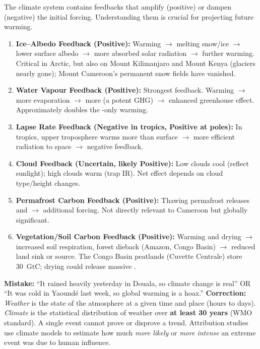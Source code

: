 \documentclass[11pt]{article}
\newcounter{popsec}
\newcounter{popsub}
\newcommand{\courssub}[1]{%
  \stepcounter{popsub}%
  \par\vspace{9pt}\noindent{\popxbold\fontsize{11.5}{13}\selectfont\color{popink}{\color{poporange}\thepopsec.\thepopsub}\hspace{6pt}#1}\par\nopagebreak\vspace{4pt}
}
\begin{document}
\courssub{Climate Feedback Loops}

The climate system contains feedbacks that amplify (positive) or dampen (negative) the initial forcing. Understanding them is crucial for projecting future warming.

\begin{propriete}
\begin{enumerate}
\item \textbf{Ice–Albedo Feedback (Positive):} Warming $\to$ melting snow/ice $\to$ lower surface albedo $\to$ more absorbed solar radiation $\to$ further warming. Critical in Arctic, but also on Mount Kilimanjaro and Mount Kenya (glaciers nearly gone); Mount Cameroon's permanent snow fields have vanished.
\item \textbf{Water Vapour Feedback (Positive):} Strongest feedback. Warming $\to$ more evaporation $\to$ more  (a potent GHG) $\to$ enhanced greenhouse effect. Approximately doubles the -only warming.
\item \textbf{Lapse Rate Feedback (Negative in tropics, Positive at poles):} In tropics, upper troposphere warms more than surface $\to$ more efficient radiation to space $\to$ negative feedback.
\item \textbf{Cloud Feedback (Uncertain, likely Positive):} Low clouds cool (reflect sunlight); high clouds warm (trap IR). Net effect depends on cloud type/height changes.
\item \textbf{Permafrost Carbon Feedback (Positive):} Thawing permafrost releases  and  $\to$ additional forcing. Not directly relevant to Cameroon but globally significant.
\item \textbf{Vegetation/Soil Carbon Feedback (Positive):} Warming and drying $\to$ increased soil respiration, forest dieback (Amazon, Congo Basin) $\to$ reduced land sink or source. The Congo Basin peatlands (Cuvette Centrale) store \SI{30}{GtC}; drying could release massive .
\end{enumerate}
\end{propriete}

\begin{attention}
\textbf{Mistake:} ``It rained heavily yesterday in Douala, so climate change is real'' OR ``It was cold in Yaoundé last week, so global warming is a hoax.''
\textbf{Correction:} \emph{Weather} is the state of the atmosphere at a given time and place (hours to days). \emph{Climate} is the statistical distribution of weather over \textbf{at least 30 years} (WMO standard). A single event cannot prove or disprove a trend. Attribution studies use climate models to estimate how much \emph{more likely} or \emph{more intense} an extreme event was due to human influence.
\end{attention}
\end{document}
